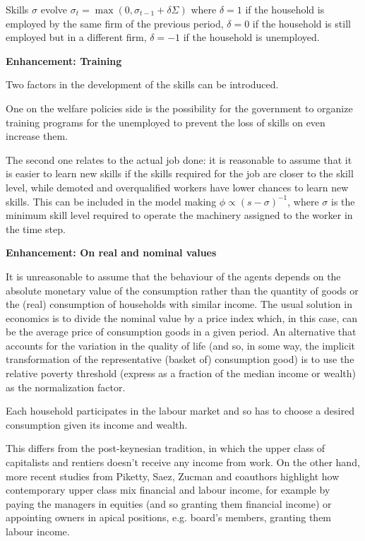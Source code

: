 \documentclass[a4paper, headings=standardclasses]{scrartcl}
\numberwithin{equation}{subsection}
\newenvironment{enh}[1][]{\begin{framed}\noindent\textbf{Enhancement: #1}\par}{\end{framed}}
\begin{document}
Skills $\sigma$ evolve $\sigma_t = \max(0,\sigma_{t-1} + \delta\Sigma)$ where $\delta=1$ if the household is employed by the same firm of the previous period, $\delta=0$ if the household is still employed but in a different firm, $\delta=-1$ if the household is unemployed.

\begin{enh}[Training]
    Two factors in the development of the skills can be introduced.

    One on the welfare policies side is the possibility for the government to organize training programs for the unemployed to prevent the loss of skills on even increase them.

    The second one relates to the actual job done: it is reasonable to assume that it is easier to learn new skills if the skills required for the job are closer to the skill level, while demoted and overqualified workers have lower chances to learn new skills. This can be included in the model making $\phi \propto (s-\sigma)^{-1}$, where $\sigma$ is the minimum skill level required to operate the machinery assigned to the worker in the time step.
\end{enh}

\begin{enh}[On real and nominal values]
    It is unreasonable to assume that the behaviour of the agents depends on the absolute monetary value of the consumption rather than the quantity of goods or the (real) consumption of households with similar income.
    The usual solution in economics is to divide the nominal value by a price index which, in this case, can be the average price of consumption goods in a given period.
    An alternative that accounts for the variation in the quality of life (and so, in some way, the implicit transformation of the representative (basket of) consumption good) is to use the relative poverty threshold (express as a fraction of the median income or wealth) as the normalization factor.
\end{enh}

Each household participates in the labour market and so has to choose a desired consumption given its income and wealth.

This differs from the post-keynesian tradition, in which the upper class of capitalists and rentiers doesn't receive any income from work. On the other hand, more recent studies from Piketty, Saez, Zucman and coauthors highlight how contemporary upper class mix financial and labour income, for example by paying the managers in equities (and so granting them financial income) or appointing owners in apical positions, e.g. board's members, granting them labour income.
\end{document}
